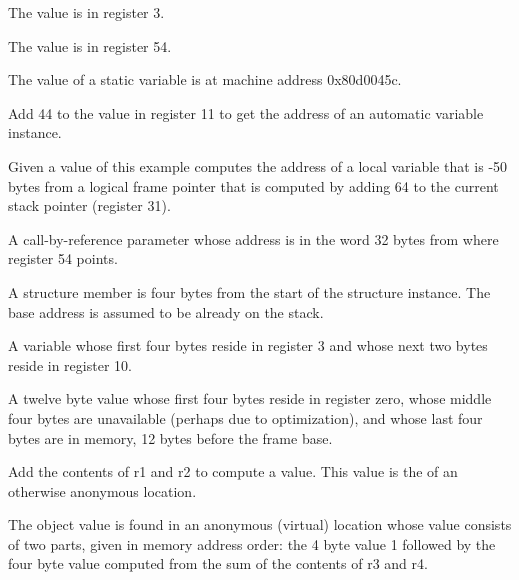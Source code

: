 \begin{description}
\descriptionitemnl{\DWOPregthree}
The value is in register 3.

The value is in register 54.

The value of a static variable is at machine address 0x80d0045c.

Add 44 to the value in register 11 to get the address of an automatic
variable instance.

Given a \DWATframebase{} value of
 this example
computes the address of a local variable that is -50 bytes from a
logical frame pointer that is computed by adding 64 to the current
stack pointer (register 31).

A call-by-reference parameter whose address is in the word 32 bytes
from where register 54 points.

A structure member is four bytes from the start of the structure
instance. The base address is assumed to be already on the stack.

A variable whose first four bytes reside in register 3 and whose next
two bytes reside in register 10.

\vspace{-2\parsep}
A twelve byte value whose first four bytes reside in register zero,
whose middle four bytes are unavailable (perhaps due to optimization),
and whose last four bytes are in memory, 12 bytes before the frame
base.

\descriptionitemnl{\DWOPbregone{} 0 \DWOPbregtwo{} 0 \DWOPplus{} \DWOPstackvalue{} }
Add the contents of r1 and r2 to compute a value. This value is the
 of an otherwise anonymous location.

\vspace{-3\parsep}
The object value is found in an anonymous (virtual) location whose
value consists of two parts, given in memory address order: the 4 byte
value 1 followed by the four byte value computed from the sum of the
contents of r3 and r4.


\end{description}
